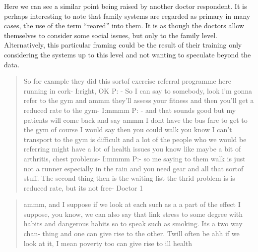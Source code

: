 Here we can see a similar point being raised by another doctor respondent. It is perhaps interesting to note that family systems are regarded as primary in many cases, the use of the term ``reared'' into them. It is as though the doctors allow themselves to consider some social issues, but only to the family level. Alternatively, this particular framing could be the result of their training only considering the systems up to this level and not wanting to speculate beyond the data. 

\begin{quotation}
  So for example they did this sortof exercise referral programme here running in cork-
I:right, OK
P: - So I can say to somebody, look i'm gonna refer to the gym and ammm they'll assess your fitness  and then you'll get a reduced rate to the gym-
I:mmmm
P: - and that sounds good but my patients will come back and say ammm I dont have the bus fare to get to the gym of course I would say then you could walk you know I can't transport to the gym is difficult and a lot of the people who we would be referring might have a lot of health issues you know like maybe a bit of arthritis, chest problems-
I:mmmm
P:- so me saying to them walk is just not a runner especially in the rain and you need gear and all that sortof stuff. The second thing then is the waiting list the thrid problem is is reduced rate, but its not free-
Doctor 1
\end{quotation}


\begin{quotation}
  ammm, and I suppose if we look at each such as a a part of the effect I suppose, you know, we can also say that link stress to some degree with habits and dangerous habits so to speak such as smoking. Its a two way chan- thing and one can give rise to the other. Twill often be ahh if we look at it, I mean poverty too can give rise to ill health
\end{quotation}



